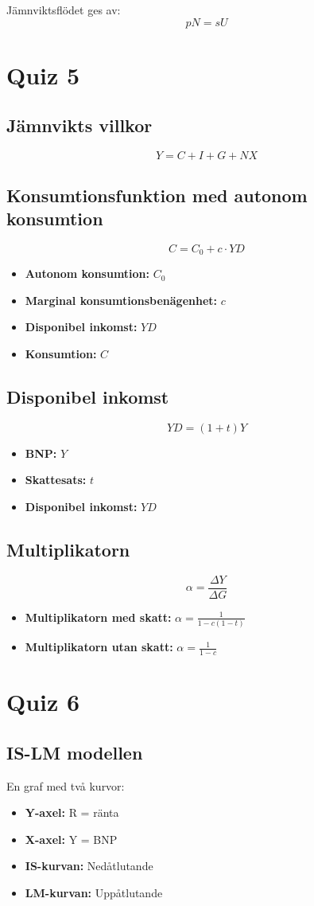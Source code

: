 \documentclass[12pt,a4paper]{article}
\begin{document}
\noindent Jämnviktsflödet ges av:
\[
pN = sU
\]

\section{Quiz 5}
\subsection{Jämnvikts villkor}
\[
Y = C + I + G + NX
\]
\subsection{Konsumtionsfunktion med autonom konsumtion}
\[
C = C_0 + c \cdot YD
\]
\begin{itemize}
    \item \textbf{Autonom konsumtion: }$C_0$
    \item \textbf{Marginal konsumtionsbenägenhet: }$c$
    \item \textbf{Disponibel inkomst: }$YD$
    \item \textbf{Konsumtion: }$C$
\end{itemize}
\subsection{Disponibel inkomst}
\[
YD = (1+t)Y
\]
\begin{itemize}
    \item \textbf{BNP: }$Y$
    \item \textbf{Skattesats: }$t$
    \item \textbf{Disponibel inkomst: }$YD$
\end{itemize}

\subsection{Multiplikatorn}
\[
\alpha = \frac{\Delta Y}{\Delta G}
\]
\begin{itemize}
    \item \textbf{Multiplikatorn med skatt: }{\large $\alpha = \frac{1}{1 - c(1-t)}$}
    \item \textbf{Multiplikatorn utan skatt: }{\large $\alpha = \frac{1}{1 - c}$}
\end{itemize}

\section{Quiz 6}
\subsection{IS-LM modellen}
En graf med två kurvor:
\begin{itemize}
    \item \textbf{Y-axel: }R = ränta
    \item \textbf{X-axel: }Y = BNP
    \item \textbf{IS-kurvan: }Nedåtlutande
    \item \textbf{LM-kurvan: }Uppåtlutande
\end{itemize}
\end{document}
